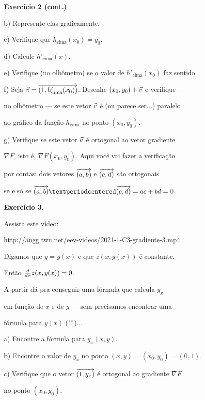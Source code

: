 \documentclass[oneside,12pt]{article}
\begin{document}
{\bf Exercício 2 (cont.)}

\msk

b) Represente elas graficamente.

c) Verifique que $h_\text{cima}(x_0) = y_0$.

d) Calcule $h'_\text{cima}(x)$.

e) Verifique (no olhômetro) se o valor de $h'_\text{cima}(x_0)$ faz sentido.

\msk

f) Seja ${\vec v} = {\overrightarrow{(1,h'_\text{cima}(x_0))}}$. Desenhe $(x_0,y_0) + {\vec v}$ e verifique ---

no olhômetro --- se este vetor ${\vec v}$ é (ou parece ser...) paralelo

ao gráfico da função $h_\text{cima}$ no ponto $(x_0,y_0)$.

\msk

g) Verifique se este vetor ${\vec v}$ é ortogonal ao vetor gradiente

$∇F$, isto é, $∇F(x_0,y_0)$. Aqui você vai fazer a verificação

por contas: dois vetores ${\overrightarrow{(a,b)}}$ e ${\overrightarrow{(c,d)}}$ são ortogonais

se e só se $\VEC{a,b}·\VEC{c,d} = ac+bd = 0$.





\newpage


{\bf Exercício 3.}

Assista este vídeo:

\ssk

{\footnotesize

\url{http://angg.twu.net/eev-videos/2021-1-C3-gradiente-3.mp4}

}

\msk

Digamos que $y=y(x)$ e que $z(x,y(x))$ é constante.

Então $\frac{d}{dx} z(x,y(x)) = 0$.

A partir dá pra conseguir uma fórmula que calcula $y_x$

em função de $x$ e de $y$ --- sem precisamos encontrar uma

fórmula para $y(x)$ (!!!)...

\msk

a) Encontre a fórmula para $y_x(x,y)$.

b) Encontre o valor de $y_x$ no ponto $(x,y) = (x_0,y_0) = (0,1)$.

c) Verifique que o vetor ${\overrightarrow{(1,y_x)}}$ é ortogonal ao gradiente $∇F$

no ponto $(x_0,y_0)$.




\newpage


\end{document}
